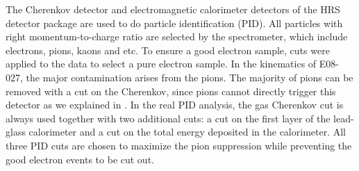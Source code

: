 The Cherenkov detector and electromagnetic calorimeter detectors of the HRS detector package are used to do particle identification (PID). All particles with right momentum-to-charge ratio are selected by the spectrometer, which include electrons, pions, kaons and etc. To ensure a good electron sample, cuts were applied to the data to select a pure electron sample. In the kinematics of E08-027, the major contamination arises from the pions. The majority of pions can be removed with a cut on the Cherenkov, since pions cannot directly trigger this detector as we explained in . In the real PID analysis, the gas Cherenkov cut is always used together with two additional cuts: a cut on the first layer of the lead-glass calorimeter and a cut on the total energy deposited in the calorimeter. All three PID cuts are chosen to maximize the pion suppression while preventing the good electron events to be cut out.

